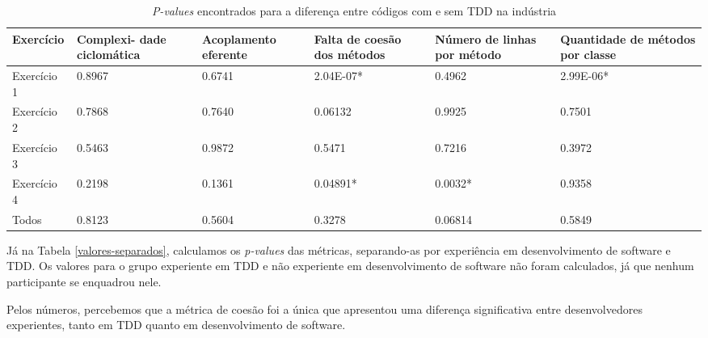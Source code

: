 \documentclass[conference]{IEEEtran}
\begin{document}
\begin{table*}
	\centering
	\begin{tabular}{ | p{3cm} | p{2cm} | p{2cm} | p{2cm} | p{2cm} | p{2cm} |}
		\hline
		Exercício & Complexi- dade ciclomática & Acoplamento eferente & Falta de coesão dos métodos & Número de linhas por método 
		& Quantidade de métodos por classe \\
		\hline
		Exercício 1 &	0.8967	&	0.6741 &	\cellcolor[gray]{0.8}2.04E-07* &	0.4962 &	\cellcolor[gray]{0.8}2.99E-06* \\
		Exercício 2	& 0.7868	&	0.7640 &	0.06132 &	0.9925 &	0.7501 \\
		Exercício 3	& 0.5463	&	0.9872 &	0.5471 &	0.7216 &	0.3972\\
		Exercício 4	& 0.2198	&	0.1361 &	\cellcolor[gray]{0.8}0.04891* &	\cellcolor[gray]{0.8}0.0032* &	0.9358\\
		\hline
		Todos &	0.8123	&	0.5604 &	0.3278 &	0.06814 &	0.5849\\
		\hline
	\end{tabular}
	\caption{\textit{P-values} encontrados para a diferença entre códigos com e sem TDD na indústria}
	\label{metricas-industria}
\end{table*}

Já na Tabela \ref{valores-separados},
calculamos os \textit{p-values} das métricas, separando-as 
por experiência em desenvolvimento de software e TDD. Os valores para o grupo
experiente em TDD e não experiente em desenvolvimento de software não foram calculados, já que nenhum
participante se enquadrou nele.

Pelos números, percebemos 
que a métrica de coesão foi a única que apresentou uma diferença significativa entre desenvolvedores
experientes, tanto em TDD quanto em desenvolvimento de software.
\end{document}
